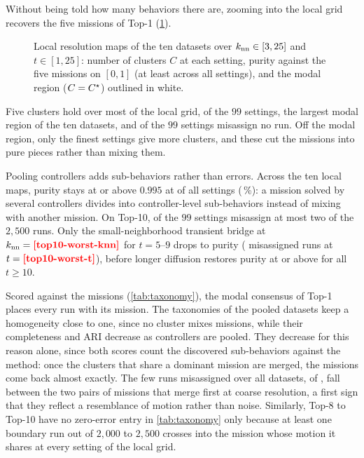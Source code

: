 \documentclass[pdflatex,sn-apa]{sn-jnl}
\begin{document}
Without being told how many behaviors there are, zooming into the local grid recovers the five missions of Top-1
(\cref{fig:resolution}).

\begin{figure}[!t]
\centering
{}
\caption{Local resolution maps of the ten datasets over $k_{\mathrm{nn}}\in[3,25]$ and $t\in[1,25]$: number of clusters $C$ at each
setting, purity against the five missions on $[0,1]$ (at least  across all 
settings), and the modal region ($C=C^{\star}$) outlined in white.}
\label{fig:resolution}
\end{figure}

Five clusters hold over most of the local grid,  of the $99$ settings, the
largest modal region of the ten datasets, and  of the $99$ settings misassign no run. Off the modal
region, only the finest settings give more clusters, and these cut the missions into pure pieces rather than mixing
them.

Pooling controllers adds sub-behaviors rather than errors. Across the ten local maps, purity stays at or above $0.995$
at  of all  settings (\,\%): a mission solved by several
controllers divides into controller-level sub-behaviors instead of mixing with another mission. On Top-10,
 of the $99$ settings misassign at most two of the $2{,}500$ runs. Only the small-neighborhood
transient bridge at $\knn=\nm{top10-worst-knn}$ for $t=5$--$9$ drops to purity 
( misassigned runs at $t=\nm{top10-worst-t}$), before longer diffusion restores purity at or above
 for all $t\ge 10$.

Scored against the missions (\cref{tab:taxonomy}), the modal consensus of Top-1 places every run with its mission. The
taxonomies of the pooled datasets keep a homogeneity close to one, since no cluster mixes missions, while their
completeness and ARI decrease as controllers are pooled. They decrease for this reason alone, since both scores count
the discovered sub-behaviors against the method: once the clusters that share a dominant mission are merged, the
missions come back almost exactly. The few runs misassigned over all datasets,  of ,
fall between the two pairs of missions that merge first at coarse resolution, a first sign that they reflect a
resemblance of motion rather than noise. Similarly, Top-8 to Top-10 have no zero-error entry in \cref{tab:taxonomy} only
because at least one boundary run out of $2{,}000$ to $2{,}500$ crosses into the mission whose motion it shares at every
setting of the local grid.
\end{document}
